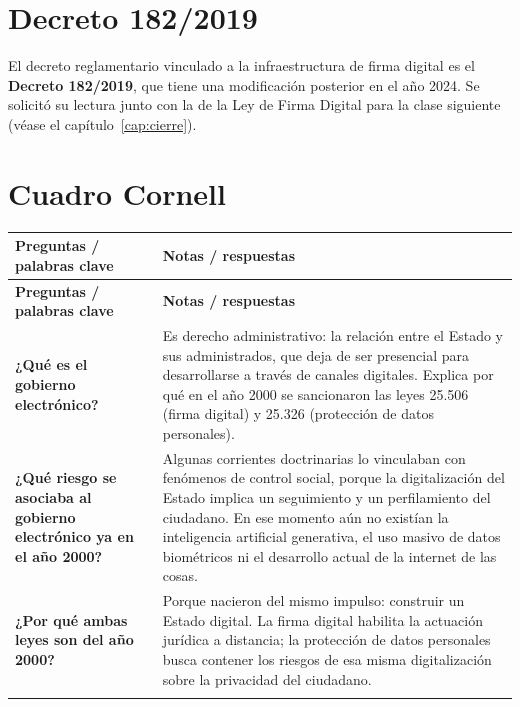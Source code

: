 \documentclass[12pt,oneside]{book}
\newlength{\cornellizq}
\newlength{\cornellder}
\begin{document}
\section{Decreto 182/2019}

El decreto reglamentario vinculado a la infraestructura de firma digital es el \textbf{Decreto 182/2019}, que tiene una modificación posterior en el año 2024. Se solicitó su lectura junto con la de la Ley de Firma Digital para la clase siguiente (véase el capítulo~\ref{cap:cierre}).

\section{Cuadro Cornell}

\begin{longtable}{
    >{\raggedright\arraybackslash}p{\cornellizq}
    >{\raggedright\arraybackslash}p{\cornellder}
}
\toprule
\textbf{Preguntas / palabras clave} & \textbf{Notas / respuestas} \\
\midrule
\endfirsthead
\toprule
\textbf{Preguntas / palabras clave} & \textbf{Notas / respuestas} \\
\midrule
\endhead

\textbf{¿Qué es el gobierno electrónico?} &
Es derecho administrativo: la relación entre el Estado y sus administrados, que deja de ser presencial para desarrollarse a través de canales digitales. Explica por qué en el año 2000 se sancionaron las leyes 25.506 (firma digital) y 25.326 (protección de datos personales). \\
\addlinespace[0.6em]
\midrule[\lightrulewidth]

\textbf{¿Qué riesgo se asociaba al gobierno electrónico ya en el año 2000?} &
Algunas corrientes doctrinarias lo vinculaban con fenómenos de control social, porque la digitalización del Estado implica un seguimiento y un perfilamiento del ciudadano. En ese momento aún no existían la inteligencia artificial generativa, el uso masivo de datos biométricos ni el desarrollo actual de la internet de las cosas. \\
\addlinespace[0.6em]
\midrule[\lightrulewidth]

\textbf{¿Por qué ambas leyes son del año 2000?} &
Porque nacieron del mismo impulso: construir un Estado digital. La firma digital habilita la actuación jurídica a distancia; la protección de datos personales busca contener los riesgos de esa misma digitalización sobre la privacidad del ciudadano. \\
\addlinespace[0.6em]
\midrule[\lightrulewidth]


\end{longtable}
\end{document}
